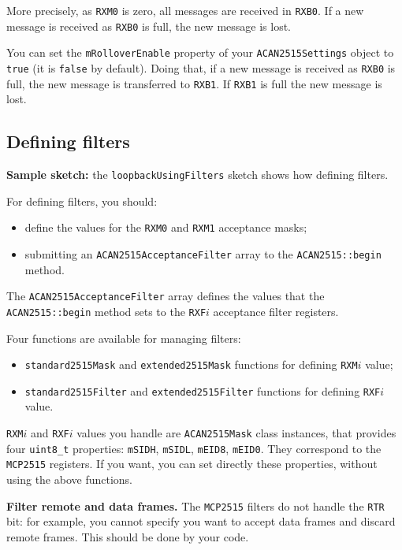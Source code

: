 \documentclass[10pt, a4paper, obeyspaces, openany]{extarticle}
\begin{document}
More precisely, as \texttt{RXM0} is zero, all messages are received in \texttt{RXB0}. If a new message is received as \texttt{RXB0} is full, the new message is lost.

You can set the \texttt{mRolloverEnable} property of your \texttt{ACAN2515Settings} object to \texttt{true} (it is \texttt{false} by default). Doing that, if a new message is received as \texttt{RXB0} is full, the new message is transferred to \texttt{RXB1}. If \texttt{RXB1} is full the new message is lost.




\subsection{Defining filters}

{\bf Sample sketch: } the \texttt{loopbackUsingFilters} sketch shows how defining filters.

For defining filters, you should:
\begin{itemize}
  \item define the values for the \texttt{RXM0} and \texttt{RXM1} acceptance masks;
  \item submitting an \texttt{ACAN2515AcceptanceFilter} array to the \texttt{ACAN2515::begin} method.
\end{itemize}

The \texttt{ACAN2515AcceptanceFilter} array defines the values that the \texttt{ACAN2515::begin} method sets to the \texttt{RXF$i$} acceptance filter registers.

Four functions are available for managing filters:
\begin{itemize}
  \item \texttt{standard2515Mask} and \texttt{extended2515Mask} functions for defining \texttt{RXM$i$} value;
  \item \texttt{standard2515Filter} and \texttt{extended2515Filter} functions for defining \texttt{RXF$i$} value.
\end{itemize}

\texttt{RXM$i$} and \texttt{RXF$i$} values you handle are \texttt{ACAN2515Mask} class instances, that provides four \texttt{uint8\_t} properties: \texttt{mSIDH}, \texttt{mSIDL}, \texttt{mEID8}, \texttt{mEID0}. They correspond to the \texttt{MCP2515} registers. If you want, you can set directly these properties, without using the above functions. 

{\bf Filter remote and data frames.} The \texttt{MCP2515} filters do not handle the \texttt{RTR} bit: for example, you cannot specify you want to accept data frames and discard remote frames. This should be done by your code.
\end{document}
